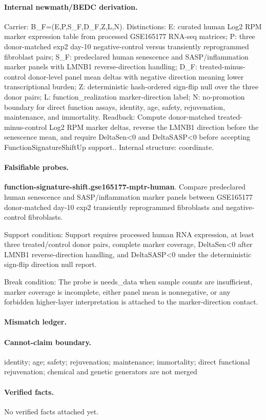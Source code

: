 \paragraph{Internal newmath/BEDC derivation.} Carrier: B\_F=(E,P,S\_F,D\_F,Z,L,N). Distinctions: E: curated human Log2 RPM marker expression table from processed GSE165177 RNA-seq matrices; P: three donor-matched exp2 day-10 negative-control versus transiently reprogrammed fibroblast pairs; S\_F: predeclared human senescence and SASP/inflammation marker panels with LMNB1 reverse-direction handling; D\_F: treated-minus-control donor-level panel mean deltas with negative direction meaning lower transcriptional burden; Z: deterministic hash-ordered sign-flip null over the three donor pairs; L: function\_realization marker-direction label; N: no-promotion boundary for direct function assays, identity, age, safety, rejuvenation, maintenance, and immortality. Readback: Compute donor-matched treated-minus-control Log2 RPM marker deltas, reverse the LMNB1 direction before the senescence mean, and require DeltaSen<0 and DeltaSASP<0 before accepting FunctionSignatureShiftUp support.. Internal structure: coordinate.

\paragraph{Falsifiable probes.}
\textbf{function-signature-shift.gse165177-mptr-human}. Compare predeclared human senescence and SASP/inflammation marker panels between GSE165177 donor-matched day-10 exp2 transiently reprogrammed fibroblasts and negative-control fibroblasts.

Support condition: Support requires processed human RNA expression, at least three treated/control donor pairs, complete marker coverage, DeltaSen<0 after LMNB1 reverse-direction handling, and DeltaSASP<0 under the deterministic sign-flip direction null report.

Break condition: The probe is needs\_data when sample counts are insufficient, marker coverage is incomplete, either panel mean is nonnegative, or any forbidden higher-layer interpretation is attached to the marker-direction contact.

\paragraph{Mismatch ledger.}
\paragraph{Cannot-claim boundary.} identity; age; safety; rejuvenation; maintenance; immortality; direct functional rejuvenation; chemical and genetic generators are not merged

\paragraph{Verified facts.}
No verified facts attached yet.
